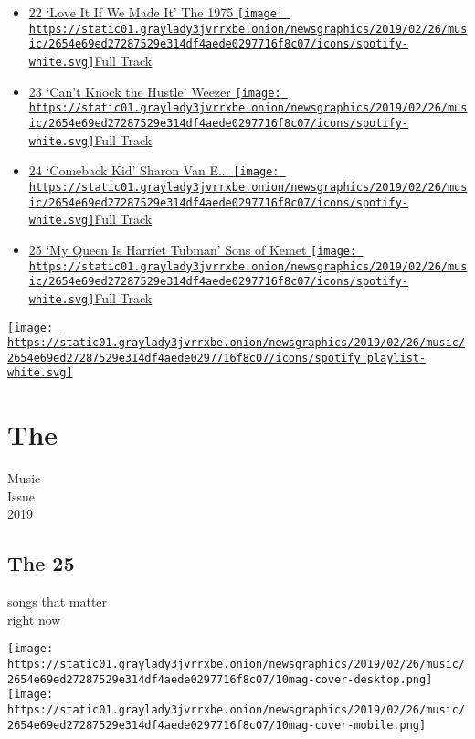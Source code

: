 \begin{itemize}
{  Track}
\item
  \protect\hyperlink{ux2fthe-1975}{22 `Love It If We Made It' The 1975 }
  \href{https://open.spotify.com/track/6WmIyn2fx1PKQ0XDpYj4VR}{\texttt{[image: https://static01.graylady3jvrrxbe.onion/newsgraphics/2019/02/26/music/2654e69ed27287529e314df4aede0297716f8c07/icons/spotify-white.svg]}Full
  Track}
\item
  \protect\hyperlink{ux2fweezer}{23 `Can't Knock the Hustle' Weezer }
  \href{https://open.spotify.com/track/3OSQcSWOOpBUGBPgCMKDdK}{\texttt{[image: https://static01.graylady3jvrrxbe.onion/newsgraphics/2019/02/26/music/2654e69ed27287529e314df4aede0297716f8c07/icons/spotify-white.svg]}Full
  Track}
\item
  \protect\hyperlink{ux2fsharon-van-etten}{24 `Comeback Kid' Sharon Van
  E... }
  \href{https://open.spotify.com/track/5nUVtL9EgUDCsjZT2Hcy9H}{\texttt{[image: https://static01.graylady3jvrrxbe.onion/newsgraphics/2019/02/26/music/2654e69ed27287529e314df4aede0297716f8c07/icons/spotify-white.svg]}Full
  Track}
\item
  \protect\hyperlink{ux2fsons-of-kemet}{25 `My Queen Is Harriet Tubman'
  Sons of Kemet }
  \href{https://open.spotify.com/track/4dSjQyjl3aHWJpk3swB0ig}{\texttt{[image: https://static01.graylady3jvrrxbe.onion/newsgraphics/2019/02/26/music/2654e69ed27287529e314df4aede0297716f8c07/icons/spotify-white.svg]}Full
  Track}
\end{itemize}

\href{https://open.spotify.com/user/nytmag/playlist/2IffJZke1mcKi7GttLi7JH?si=PWMrqjyTS-aUPFHW6AaarA}{\texttt{[image: https://static01.graylady3jvrrxbe.onion/newsgraphics/2019/02/26/music/2654e69ed27287529e314df4aede0297716f8c07/icons/spotify\_playlist-white.svg]}}

\hypertarget{the}{%
\section{The}\label{the}}

Music\\
Issue\\
2019

\hypertarget{the-25}{%
\subsection{The 25}\label{the-25}}

songs that matter\\
right now

\texttt{[image: https://static01.graylady3jvrrxbe.onion/newsgraphics/2019/02/26/music/2654e69ed27287529e314df4aede0297716f8c07/10mag-cover-desktop.png]}
\texttt{[image: https://static01.graylady3jvrrxbe.onion/newsgraphics/2019/02/26/music/2654e69ed27287529e314df4aede0297716f8c07/10mag-cover-mobile.png]}

